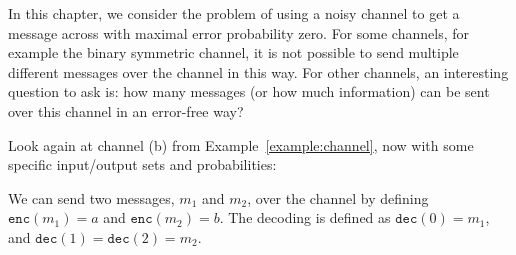 \newcommand{\enc}[1]{\mathtt{enc}(#1)}
\newcommand{\dec}[1]{\mathtt{dec}(#1)}

In this chapter, we consider the problem of using a noisy channel to get a message across with maximal error probability zero. For some channels, for example the binary symmetric channel, it is not possible to send multiple different messages over the channel in this way. For other channels, an interesting question to ask is: how many messages (or how much information) can be sent over this channel in an error-free way?

\begin{example}
Look again at channel (b) from Example~\ref{example:channel}, now with some specific input/output sets and probabilities:
\begin{center}
\end{center}
We can send two messages, $m_1$ and $m_2$, over the channel by defining $\enc{m_1} = a$ and $\enc{m_2} = b$. The decoding is defined as $\dec{0} = m_1$, and $\dec{1} = \dec{2} = m_2$.
\end{example}


